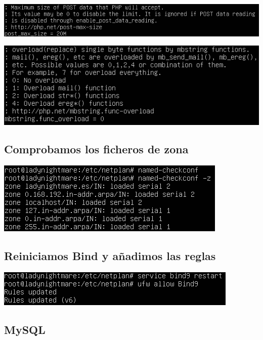 \documentclass{article}
\begin{document}
\begin{center}
\includegraphics[scale=0.6]{images/postSize.png}
\end{center}

\begin{center}
\includegraphics[scale=0.6]{images/funcOverload.png}
\end{center}

\subsection{Comprobamos los ficheros de zona}

\begin{center}
\includegraphics[scale=0.6]{images/check.png}
\end{center}

\subsection{Reiniciamos Bind y añadimos las reglas}

\begin{center}
\includegraphics[scale=0.6]{images/reinicioReglas.png}
\end{center}

\subsection{MySQL}
\end{document}
